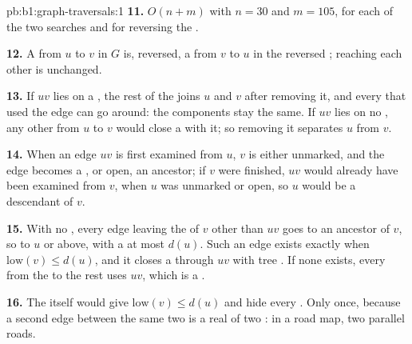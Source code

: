 \begin{solution}{pb:b1:graph-traversals:1}
\textbf{11.} $O(n + m)$ with $n = 30$ and $m = 105$, for each of the two searches and for reversing the .

\textbf{12.} A  from $u$ to $v$ in $G$ is, reversed, a  from $v$ to $u$ in the reversed ; reaching each
other is unchanged.

\textbf{13.} If $u v$ lies on a , the rest of the  joins $u$ and $v$ after removing it, and every  that
used the edge can go around: the components stay the same. If $u v$ lies on no , any other  from $u$ to $v$
would close a  with it; so removing it separates $u$ from $v$.

\textbf{14.} When an edge $u v$ is first examined from $u$, $v$ is either unmarked, and the edge becomes a , or
open, an ancestor; if $v$ were finished, $u v$ would already have been examined from $v$, when $u$ was unmarked or
open, so $u$ would be a descendant of $v$.

\textbf{15.} With no , every edge leaving the  of $v$ other than $u v$ goes to an ancestor of $v$, so
to $u$ or above, with a  at most $d(u)$. Such an edge exists exactly when $\mathrm{low}(v) \leq d(u)$,
and it closes a  through $u v$ with tree . If none exists, every  from the  to the rest uses
$u v$, which is a .

\textbf{16.} The  itself would give $\mathrm{low}(v) \leq d(u)$ and hide every . Only once, because a
second edge between the same two  is a real  of two : in a road map, two parallel roads.


\end{solution}
